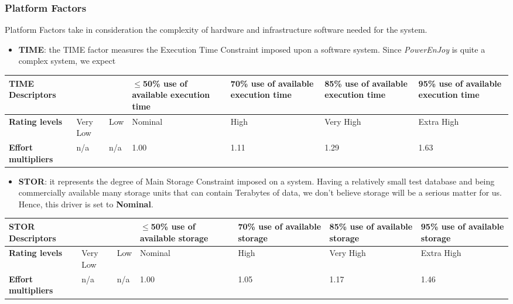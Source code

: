	
	
	\subsubsection*{Platform Factors}
	Platform Factors take in consideration the complexity of hardware and infrastructure software needed for the system. 
	
	
		\begin{itemize}
			\item \textbf{TIME}: the TIME factor measures the Execution Time Constraint imposed upon a software system. Since \textit{PowerEnJoy} is quite a complex system, we expect %
		\end{itemize}
		
		\begin{center}
			\begin{tabular}{ | C{2cm} | C{2cm} | C{2cm} | C{2cm} | C{2cm} | C{2cm} | C{2cm} | }
				\hline
				\textbf{TIME Descriptors} & & & $\leq$50\% use of available execution time & 70\% use of available execution time & 85\% use of available execution time & 95\% use of available execution time\\ \hline
			
				\textbf{Rating levels} & Very Low & Low & Nominal & High & Very High & Extra High\\ \hline
			
				\textbf{Effort multipliers} & n/a & n/a & 1.00 & 1.11 & 1.29 & 1.63\\ \hline
			\end{tabular}
		\end{center}
		
		
		
		
		\begin{itemize}
			\item \textbf{STOR}: it represents the degree of Main Storage Constraint imposed on a system. Having a relatively small test database and being commercially available many storage units that can contain Terabytes of data, we don't believe storage will be a serious matter for us. Hence, this driver is set to \textbf{Nominal}.
		\end{itemize}
		
		\begin{center}
			\begin{tabular}{ | C{2cm} | C{2cm} | C{2cm} | C{2cm} | C{2cm} | C{2cm} | C{2cm} | }
				\hline
				\textbf{STOR Descriptors} & & & $\leq$50\% use of available storage & 70\% use of available storage & 85\% use of available storage & 95\% use of available storage\\ \hline
			
				\textbf{Rating levels} & Very Low & Low & Nominal & High & Very High & Extra High\\ \hline
			
				\textbf{Effort multipliers} & n/a & n/a & 1.00 & 1.05 & 1.17 & 1.46\\ \hline
			\end{tabular}
		\end{center}
		
